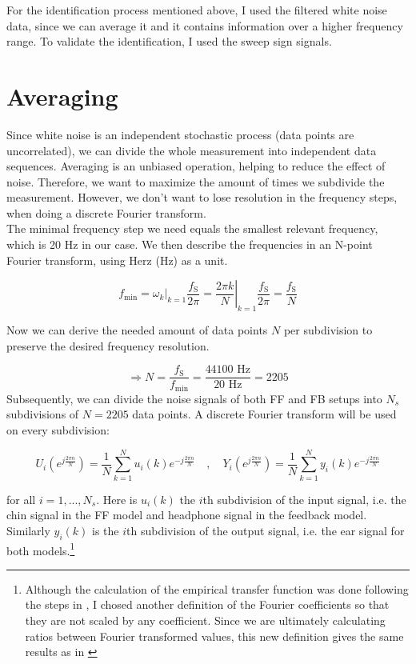 For the identification process mentioned above, I used the filtered white noise data, since we can average it and it contains information over a higher frequency range. To validate the identification, I used the sweep sign signals.

\section{Averaging}

Since white noise is an independent stochastic process (data points are uncorrelated), we can divide the whole measurement into independent data sequences. Averaging is an unbiased operation, helping to reduce the effect of noise. Therefore, we want to maximize the amount of times we subdivide the measurement. However, we don't want to lose resolution in the frequency steps, when doing a discrete Fourier transform.\\

The minimal frequency step we need equals the smallest relevant frequency, which is 20 Hz in our case. We then describe the frequencies in an N-point Fourier transform, using Herz (Hz) as a unit.

\[ f_\text{min} =\left. \omega_k\right|_{k = 1}\frac{f_\text{S}}{2\pi} = \left. \frac{2\pi k}{N}\right|_{k = 1}\frac{f_\text{S}}{2\pi} = \frac{f_\text{S}}{N} \]

Now we can derive the needed amount of data points $N$ per subdivision to preserve the desired frequency resolution.

\[\Rightarrow N = \frac{f_\text{S}}{f_\text{min}} = \frac{44100 \text{ Hz}}{20 \text{ Hz}} = 2205\]
Subsequently, we can divide the noise signals of both FF and FB setups into $N_s$ subdivisions of $N = 2205$ data points. A discrete Fourier transform will be used on every subdivision:

\[U_i(e^{j\frac{2\pi n}{N}}) = \frac{1}{N}\sum\limits_{k = 1}^{N }u_i(k)e^{-j\frac{2\pi n}{N}} \quad, \quad Y_i(e^{j\frac{2\pi n}{N}}) = \frac{1}{N}\sum\limits_{k = 1}^{N }y_i(k)e^{-j\frac{2\pi n}{N}}\]

for all $i = 1, ..., N_s$. Here is $u_i(k)$ the $i$th subdivision of the input signal, i.e. the chin signal in the FF model and headphone signal in the feedback model. Similarly $y_i(k)$ is the $i$th subdivision of the output signal, i.e. the ear signal for both models.\footnote[2]{Although the calculation of the empirical transfer function was done following the steps in \cite{ljung1999system}, I chosed another definition of the Fourier coefficients so that they are not scaled by any coefficient. Since we are ultimately calculating ratios between Fourier transformed values, this new definition gives the same results as in \cite{ljung1999system}} \\

